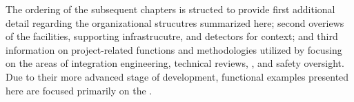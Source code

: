 The ordering of the subsequent chapters is structed to provide first
additional detail regarding the organizational strucutres summarized
here; second overiews of the facilities, supporting infrastrucutre,
and detectors for context; and third information on project-related
functions and methodologies utilized by  
focusing on the areas of integration engineering, technical reviews,
, and safety oversight.  Due to their more advanced stage of
development, functional examples presented here are focused primarily
on the  .
